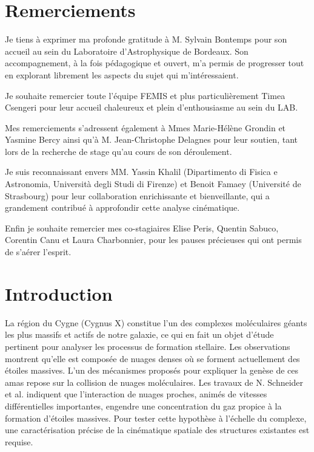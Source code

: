 \documentclass[a4paper, 11pt]{article}
\begin{document}
	\section*{Remerciements}
	\thispagestyle{empty}
	Je tiens à exprimer ma profonde gratitude à M. Sylvain Bontemps pour son accueil au sein du Laboratoire d’Astrophysique de Bordeaux. Son accompagnement, à la fois pédagogique et ouvert, m’a permis de progresser tout en explorant librement les aspects du sujet qui m’intéressaient.
	
	Je souhaite remercier toute l'équipe FEMIS et plus particulièrement Timea Csengeri pour leur accueil chaleureux et plein d'enthousiasme au sein du LAB.
	
	Mes remerciements s’adressent également à Mmes Marie-Hélène Grondin et Yasmine Bercy ainsi qu'à M. Jean-Christophe Delagnes pour leur soutien, tant lors de la recherche de stage qu’au cours de son déroulement.
	
	Je suis reconnaissant envers MM. Yassin Khalil (Dipartimento di Fisica e Astronomia, Università degli Studi di Firenze) et Benoit Famaey (Université de Strasbourg) pour leur collaboration enrichissante et bienveillante, qui a grandement contribué à approfondir cette analyse cinématique.
	
	Enfin je souhaite remercier mes co-stagiaires Elise Peris, Quentin Sabuco, Corentin Canu et Laura Charbonnier, pour les pauses précieuses qui ont permis de s'aérer l'esprit.
	\newpage
	
	\tableofcontents
	\thispagestyle{empty}
	\newpage
	\setcounter{page}{1}
	\section{Introduction}
	La région du Cygne (Cygnus X) constitue l'un des complexes moléculaires géants les plus massifs et actifs de notre galaxie, ce qui en fait un objet d'étude pertinent pour analyser les processus de formation stellaire. Les observations montrent qu'elle est composée de nuages denses où se forment actuellement des étoiles massives. L’un des mécanismes proposés pour expliquer la genèse de ces amas repose sur la collision de nuages moléculaires. Les travaux de N. Schneider et al. \cite{schneider2023} indiquent que l'interaction de nuages proches, animés de vitesses différentielles importantes, engendre une concentration du gaz propice à la formation d’étoiles massives. Pour tester cette hypothèse à l'échelle du complexe, une caractérisation précise de la cinématique spatiale des structures existantes est requise.
	
\end{document}
